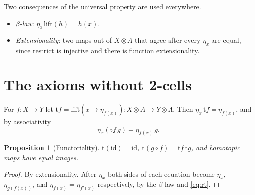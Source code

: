 \documentclass[11pt]{amsart}
\numberwithin{equation}{section}
\newtheorem{proposition}[theorem]{Proposition}
\theoremstyle{definition}
\theoremstyle{remark}
\newcommand{\id}{\mathrm{id}}
\newcommand{\tmap}{\mathrm{t}}
\begin{document}
Two consequences of the universal property are used everywhere.
\begin{itemize}
\item \emph{$\beta$-law}: $\eta_x\,\mathrm{lift}(h)=h(x)$.
\item \emph{Extensionality}: two maps out of $X\otimes A$ that agree after every
  $\eta_x$ are equal, since restrict is injective and there is function
  extensionality.
\end{itemize}

\section{The axioms without 2-cells}

For $f:X\to Y$ let $\tmap f = \mathrm{lift}(x\mapsto \eta_{f(x)}) : X\otimes A\to
Y\otimes A$. Then $\eta_x\,\tmap f=\eta_{f(x)}$, and by associativity
\begin{equation}\label{eq:rt}
\eta_x(\tmap f\, g)=\eta_{f(x)}\,g .
\end{equation}

\begin{proposition}[Functoriality]
$\tmap(\id)=\id$, $\tmap(g\circ f)=\tmap f\,\tmap g$, and homotopic maps have
equal images.
\end{proposition}
\begin{proof}
By extensionality. After $\eta_x$ both sides of each equation become
$\eta_x$, $\eta_{g(f(x))}$, and $\eta_{f(x)}=\eta_{f'(x)}$ respectively, by the
$\beta$-law and \eqref{eq:rt}.
\end{proof}
\end{document}

